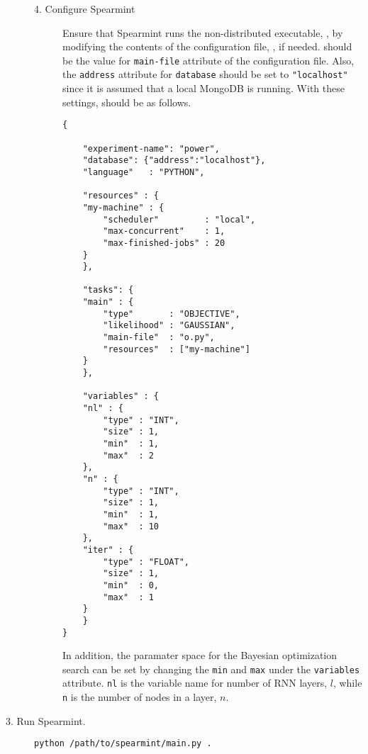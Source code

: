 \begin{description}
\begin{description}
  \item[4. Configure \textsf{Spearmint}] \hfill
    
    Ensure that \textsf{Spearmint} runs the non-distributed executable, , by modifying the contents of the configuration file, , if needed.
     should be the value for \texttt{main-file} attribute of the configuration file.
    Also, the \texttt{address} attribute for \texttt{database} should be set to \texttt{"localhost"} since it is assumed that a local \textsf{MongoDB} is running.
    With these settings,  should be as follows.

\begin{verbatim}
{

    "experiment-name": "power",
    "database": {"address":"localhost"},
    "language"   : "PYTHON",
    
    "resources" : {
	"my-machine" : {
	    "scheduler"         : "local",
	    "max-concurrent"    : 1,
	    "max-finished-jobs" : 20
	}
    },

    "tasks": {
	"main" : {
	    "type"       : "OBJECTIVE",
	    "likelihood" : "GAUSSIAN",
	    "main-file"  : "o.py",
	    "resources"  : ["my-machine"]
	}
    },
    
    "variables" : {
	"nl" : {
	    "type" : "INT",
	    "size" : 1,
	    "min"  : 1,
	    "max"  : 2
	},
	"n" : {
	    "type" : "INT",
	    "size" : 1,
	    "min"  : 1,
	    "max"  : 10
	},
	"iter" : {
	    "type" : "FLOAT",
	    "size" : 1,
	    "min"  : 0,
	    "max"  : 1
	}
    }
}
\end{verbatim}

    In addition, the paramater space for the Bayesian optimization search can be set by changing the \texttt{min} and \texttt{max} under the \texttt{variables} attribute.
    \texttt{nl} is the variable name for number of RNN layers, $l$, while \texttt{n} is the number of nodes in a layer, $n$.



\end{description}

\item[3. Run \textsf{Spearmint}.] \hfill

\begin{verbatim}
python /path/to/spearmint/main.py .    
\end{verbatim}


\end{description}


